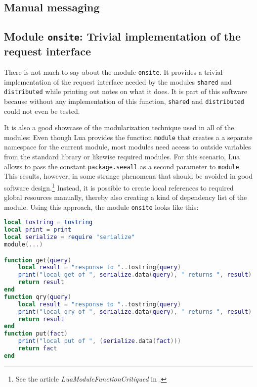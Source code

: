 \begin{appendices}

\chapter{Manual messaging}

\section{Module \texttt{onsite}: Trivial implementation of the request interface}
\label{sec:app:onsite}

There is not much to say about the module \texttt{onsite}. It provides a trivial implementation of the request interface needed by the modules \texttt{shared} and \texttt{distributed} while printing out notes on what it does. It is part of this software because without any implementation of this function, \texttt{shared} and \texttt{distributed} could not even be tested.

It is also a good showcase of the modularization technique used in all of the modules: Even though Lua provides the function \texttt{module} that creates a a separate namespace for the current module, most modules need access to outside variables from the standard library or likewise required modules. For this scenario, Lua allows to pass the constant \texttt{package.seeall} as a second parameter to \texttt{module}. This results, however, in some strange phenomena that should be avoided in good software design.\footnote{See the article \emph{LuaModuleFunctionCritiqued} in \cite{LuaUsersWiki}.} Instead, it is possible to create local references to required global resources manually, thereby also creating a kind of dependency list of the module. Using this approach, the module \texttt{onsite} looks like this:

\begin{lstlisting}[language=lua, caption={The module \texttt{onsite}}, label=lst:onsite, name=lst:onsite]
local tostring = tostring
local print = print
local serialize = require "serialize"
module(...)

function get(query)
	local result = "response to "..tostring(query)
	print("local get of ", serialize.data(query), " returns ", result)
	return result
end
function qry(query)
	local result = "response to "..tostring(query)
	print("local qry of ", serialize.data(query), " returns ", result)
	return result
end
function put(fact)
	print("local put of ", (serialize.data(fact)))
	return fact
end
\end{lstlisting}


\end{appendices}
